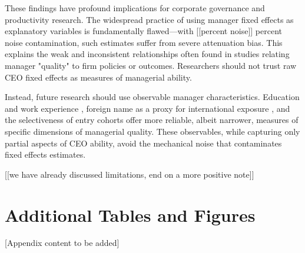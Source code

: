 \documentclass[11pt,a4paper]{article}
\begin{document}
These findings have profound implications for corporate governance and productivity research. The widespread practice of using manager fixed effects as explanatory variables is fundamentally flawed—with [[percent noise]] percent noise contamination, such estimates suffer from severe attenuation bias. This explains the weak and inconsistent relationships often found in studies relating manager "quality" to firm policies or outcomes. Researchers should not trust raw CEO fixed effects as measures of managerial ability.

Instead, future research should use observable manager characteristics. Education and work experience \citep{DePirro2025}, foreign name as a proxy for international exposure \citep{Koren2023expat}, and the selectiveness of entry cohorts \citep{koren2024managers} offer more reliable, albeit narrower, measures of specific dimensions of managerial quality. These observables, while capturing only partial aspects of CEO ability, avoid the mechanical noise that contaminates fixed effects estimates.

[[we have already discussed limitations, end on a more positive note]]




\appendix

\section{Additional Tables and Figures}

[Appendix content to be added]
\end{document}
